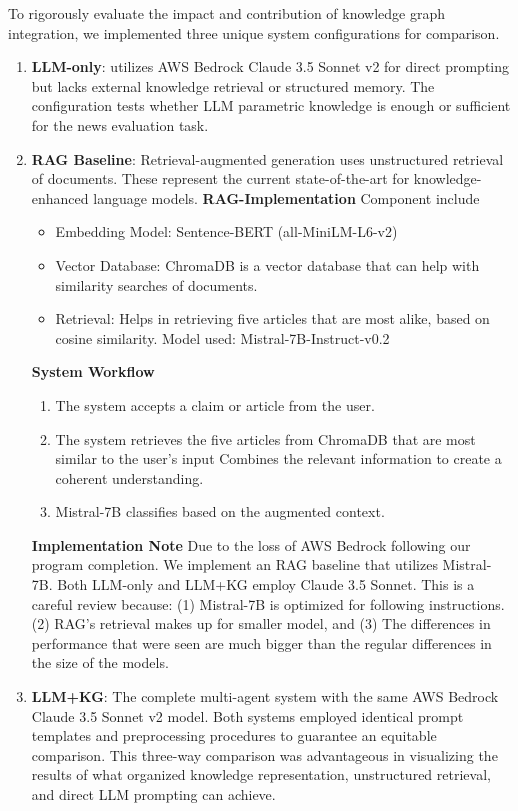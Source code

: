 \documentclass[11pt]{article}
\begin{document}
To rigorously evaluate the impact and contribution of knowledge graph integration, we implemented three unique system configurations for comparison.
\begin{enumerate}
    \item \textbf{LLM-only}: utilizes AWS Bedrock Claude 3.5 Sonnet v2 for direct prompting but lacks external knowledge retrieval or structured memory. The configuration tests whether LLM parametric knowledge is enough or sufficient for the news evaluation task.

    \item \textbf{RAG Baseline}: Retrieval-augmented generation \cite{r33}  uses unstructured retrieval of documents. These represent the current state-of-the-art for knowledge-enhanced language models.
\textbf{RAG-Implementation}  Component include
\begin{itemize}
    \item Embedding Model:  Sentence-BERT (all-MiniLM-L6-v2)
    \item Vector Database: ChromaDB is a vector database that can help with similarity searches of documents.
    \item Retrieval: Helps in retrieving five articles that are most alike, based on cosine similarity. Model used: Mistral-7B-Instruct-v0.2 \cite{r34}

\end{itemize}
    
\textbf{System Workflow}
\begin{enumerate}
    \item The system accepts a claim or article from the user.
    \item The system retrieves the five articles from ChromaDB that are most similar to the user's input
Combines the relevant information to create a coherent understanding.
\item Mistral-7B classifies  based on the augmented context.
\end{enumerate}

\textbf{Implementation Note}
Due to the loss of AWS Bedrock following our program completion.  We implement an RAG baseline that utilizes Mistral-7B. Both LLM-only and LLM+KG employ Claude 3.5 Sonnet. This is a careful review because:
(1) Mistral-7B is optimized for following instructions.
(2) RAG's retrieval makes up for smaller model, and
(3) The differences in performance that were seen are much bigger than the regular differences in the size of the models.

\item \textbf{LLM+KG}: The complete multi-agent system with the same AWS Bedrock Claude 3.5 Sonnet v2 model. Both systems employed identical prompt templates and preprocessing procedures to guarantee an equitable comparison. 
This three-way comparison was advantageous in visualizing the results of what organized knowledge representation, unstructured retrieval, and direct LLM prompting can achieve.


\end{enumerate}
\end{document}
